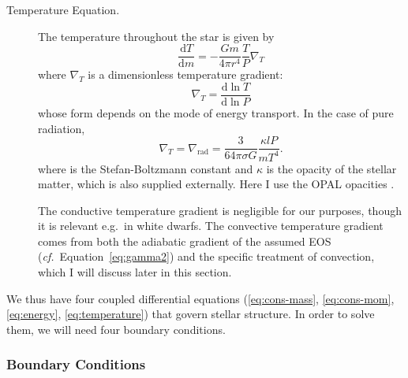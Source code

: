 \begin{description}
    \item[Temperature Equation.]
    The temperature throughout the star is given by 
    \begin{equation} \label{eq:temperature} \boxed{
        \frac{\text{d}T}{\text{d}m}
        =
        -\frac{Gm}{4\pi r^4} \frac{T}{P} \nabla_T
    }\end{equation}
    where $\nabla_T$ is a dimensionless temperature gradient:
    \begin{equation}
        \nabla_T 
        =
        \frac{\text{d}\ln T}{\text{d}\ln P}
    \end{equation}
    whose form depends on the mode of energy transport. 
    In the case of pure radiation,
    \begin{equation} \label{eq:radiative-gradiant}
        \nabla_T 
        = 
        \nabla_{\text{rad}} 
        =
        \frac{3}{64\pi \sigma G}
        \frac{\kappa l P}{m T^4}.
    \end{equation}
    where 
    is the Stefan-Boltzmann constant and $\kappa$ is the opacity of the stellar matter, which is also supplied externally. 
    Here I use the \textsc{OPAL} opacities \citep{1996ApJ...464..943I}. 
    
    The conductive temperature gradient is negligible for our purposes, though it is relevant e.g.~in white dwarfs. 
    The convective temperature gradient comes from both the adiabatic gradient of the assumed EOS (\emph{cf.}~Equation~\ref{eq:gamma2}) and the specific treatment of convection, which I will discuss later in this section. 
    \iffalse
    In the case of convection, and ignoring superadiabaticity, 
    \begin{equation}
        \nabla_T
        =
        \nabla_{\text{ad}} 
        =
        \left(
            \frac{\partial \ln T}{\partial \ln P}
        \right)_{\text{ad}}
    \end{equation}
    where an adiabatic derivative is taken at constant specific entropy, which comes from the EOS. 
    \fi
\end{description}

\noindent We thus have four coupled differential equations (\ref{eq:cons-mass}, \ref{eq:cons-mom}, \ref{eq:energy}, \ref{eq:temperature}) that govern stellar structure. 
In order to solve them, we will need four boundary conditions. 

\subsubsection*{Boundary Conditions}

